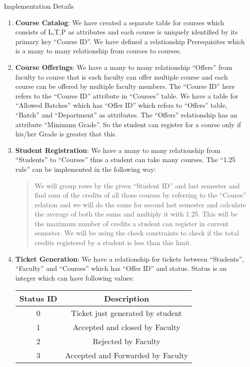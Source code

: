 \documentclass{beamer}
\begin{document}
\begin{frame}[allowframebreaks]{Implementation Details}
\begin{enumerate}
\item {\bf Course Catalog}: We have created a separate table for courses which consists of L,T,P as attributes and each course is uniquely identified by its primary key ``Course ID''. We have defined a relationship Prerequisites which is a many to many relationship from courses to courses.
\item {\bf Course Offerings}: We have a many to many relationship ``Offers'' from faculty to course that is each faculty can offer multiple course and each course can be offered by multiple faculty members. The ``Course ID'' here refers to the ``Course ID'' attribute in ``Courses'' table. We have a table for ``Allowed Batches'' which has ``Offer ID'' which refers to ``Offers'' table, ``Batch'' and ``Department'' as attributes. The ``Offers'' relationship has an attribute ``Minimum Grade''. So the student can register for a course only if his/her Grade is greater that this.
\item {\bf Student Registration}: We have a many to many relationship from ``Students'' to ``Courses'' thus a student can take many courses. The ``1.25 rule'' can be implemented in the following way:
\begin{quote}
We will group rows by the given ``Student ID'' and last semester and find sum of the credits of all those courses by referring to the ``Course'' relation and we will do the same for second last semester and calculate the average of both the sums and multiply it with 1.25. This will be the maximum number of credits a student can register in current semester. We will be using the check constraints to check if the total credits registered by a student is less than this limit.
\end{quote}
\item {\bf Ticket Generation}: We have a relationship for tickets between ``Students'', ``Faculty'' and ``Courses'' which has ``Offer ID'' and status. Status is an integer which can have following values:
\begin{center}
\begin{tabular}{c |c}
Status ID & Description\\\hline
0&Ticket just generated by student\\
1&Accepted and closed by Faculty\\
2&Rejected by Faculty\\
3&Accepted and Forwarded by Faculty\\

\end{tabular}
\end{center}
\end{enumerate}
\end{frame}
\end{document}
